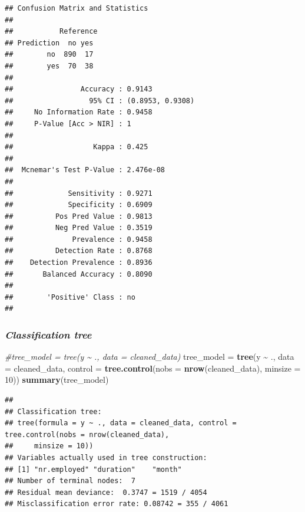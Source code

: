 \documentclass[
]{article}
\newenvironment{Shaded}{\begin{snugshade}}{\end{snugshade}}
\newcommand{\AttributeTok}[1]{\textcolor[rgb]{0.13,0.29,0.53}{#1}}
\newcommand{\CommentTok}[1]{\textcolor[rgb]{0.56,0.35,0.01}{\textit{#1}}}
\newcommand{\DecValTok}[1]{\textcolor[rgb]{0.00,0.00,0.81}{#1}}
\newcommand{\FunctionTok}[1]{\textcolor[rgb]{0.13,0.29,0.53}{\textbf{#1}}}
\newcommand{\NormalTok}[1]{#1}
\newcommand{\OtherTok}[1]{\textcolor[rgb]{0.56,0.35,0.01}{#1}}
\newcommand{\SpecialCharTok}[1]{\textcolor[rgb]{0.81,0.36,0.00}{\textbf{#1}}}
\begin{document}
\begin{verbatim}
## Confusion Matrix and Statistics
## 
##           Reference
## Prediction  no yes
##        no  890  17
##        yes  70  38
##                                           
##                Accuracy : 0.9143          
##                  95% CI : (0.8953, 0.9308)
##     No Information Rate : 0.9458          
##     P-Value [Acc > NIR] : 1               
##                                           
##                   Kappa : 0.425           
##                                           
##  Mcnemar's Test P-Value : 2.476e-08       
##                                           
##             Sensitivity : 0.9271          
##             Specificity : 0.6909          
##          Pos Pred Value : 0.9813          
##          Neg Pred Value : 0.3519          
##              Prevalence : 0.9458          
##          Detection Rate : 0.8768          
##    Detection Prevalence : 0.8936          
##       Balanced Accuracy : 0.8090          
##                                           
##        'Positive' Class : no              
## 
\end{verbatim}

\subsubsection{\texorpdfstring{\textbf{\emph{Classification
tree}}}{Classification tree}}\label{classification-tree}

\begin{Shaded}
\begin{Highlighting}[]
\CommentTok{\#tree\_model = tree(y \textasciitilde{} ., data = cleaned\_data)}
\NormalTok{tree\_model }\OtherTok{=} \FunctionTok{tree}\NormalTok{(y }\SpecialCharTok{\textasciitilde{}}\NormalTok{ ., }\AttributeTok{data =}\NormalTok{ cleaned\_data, }
                 \AttributeTok{control =} \FunctionTok{tree.control}\NormalTok{(}\AttributeTok{nobs =} \FunctionTok{nrow}\NormalTok{(cleaned\_data), }\AttributeTok{minsize =} \DecValTok{10}\NormalTok{))}
\FunctionTok{summary}\NormalTok{(tree\_model)}
\end{Highlighting}
\end{Shaded}

\begin{verbatim}
## 
## Classification tree:
## tree(formula = y ~ ., data = cleaned_data, control = tree.control(nobs = nrow(cleaned_data), 
##     minsize = 10))
## Variables actually used in tree construction:
## [1] "nr.employed" "duration"    "month"      
## Number of terminal nodes:  7 
## Residual mean deviance:  0.3747 = 1519 / 4054 
## Misclassification error rate: 0.08742 = 355 / 4061
\end{verbatim}
\end{document}
